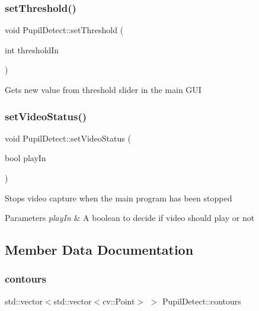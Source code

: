 \subsubsection{\texorpdfstring{set\+Threshold()}{setThreshold()}}
{\footnotesize\ttfamily void Pupil\+Detect\+::set\+Threshold (\begin{DoxyParamCaption}\item[{int}]{threshold\+In }\end{DoxyParamCaption})}

Gets new value from threshold slider in the main G\+UI \mbox{\label{class_pupil_detect_a59eaecc4b0dfb1c380d3c5d5ebf806f0}} 
\subsubsection{\texorpdfstring{set\+Video\+Status()}{setVideoStatus()}}
{\footnotesize\ttfamily void Pupil\+Detect\+::set\+Video\+Status (\begin{DoxyParamCaption}\item[{bool}]{play\+In }\end{DoxyParamCaption})}

Stops video capture when the main program has been stopped 
\begin{DoxyParams}{Parameters}
{\em play\+In} & A boolean to decide if video should play or not \\
\hline
\end{DoxyParams}


\subsection{Member Data Documentation}
\mbox{\label{class_pupil_detect_a28325d88d52b09e78d25f17b3d898aeb}} 
\subsubsection{\texorpdfstring{contours}{contours}}
{\footnotesize\ttfamily std\+::vector$<$std\+::vector$<$cv\+::\+Point$>$ $>$ Pupil\+Detect\+::contours\hspace{0.3cm}{\ttfamily [private]}}

